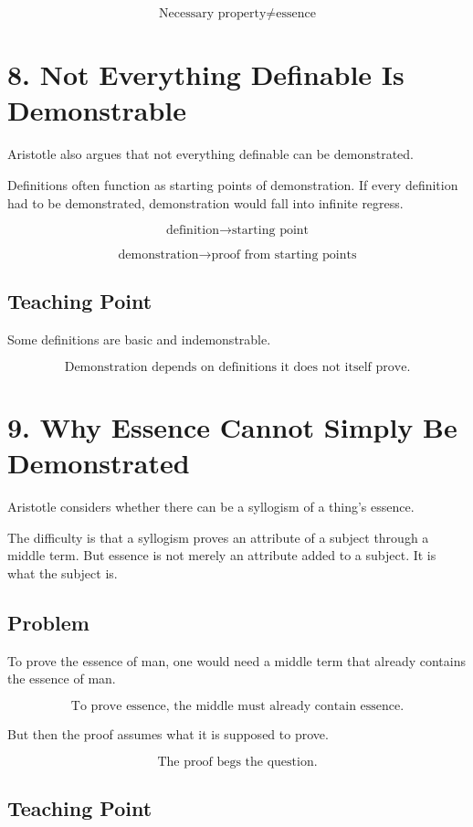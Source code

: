 \documentclass[12pt]{article}
\begin{document}
\[
\boxed{
\text{Necessary property} \neq \text{essence}
}
\]

\section*{8. Not Everything Definable Is Demonstrable}

Aristotle also argues that not everything definable can be demonstrated.

Definitions often function as starting points of demonstration. If every
definition had to be demonstrated, demonstration would fall into infinite
regress.

\[
\text{definition} \rightarrow \text{starting point}
\]

\[
\text{demonstration} \rightarrow \text{proof from starting points}
\]

\subsection*{Teaching Point}

Some definitions are basic and indemonstrable.

\[
\boxed{
\text{Demonstration depends on definitions it does not itself prove.}
}
\]

\section*{9. Why Essence Cannot Simply Be Demonstrated}

Aristotle considers whether there can be a syllogism of a thing's essence.

The difficulty is that a syllogism proves an attribute of a subject through a
middle term. But essence is not merely an attribute added to a subject. It is
what the subject is.

\subsection*{Problem}

To prove the essence of man, one would need a middle term that already contains
the essence of man.

\[
\text{To prove essence, the middle must already contain essence.}
\]

But then the proof assumes what it is supposed to prove.

\[
\boxed{
\text{The proof begs the question.}
}
\]

\subsection*{Teaching Point}
\end{document}
